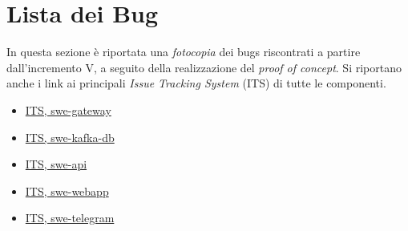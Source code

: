 

\newpage

\appendix
{}

\section{Lista dei Bug}

In questa sezione è riportata una \textit{fotocopia} dei bugs riscontrati a partire dall'incremento V, a seguito della realizzazione del \textit{proof of concept}. Si riportano anche i link ai principali \textit{Issue Tracking System} (ITS) di tutte le componenti.

	\begin{itemize}
		\item \href{https://github.com/RedRoundRobin/swe-gateway/issues}{ITS, swe-gateway}
		\item \href{https://github.com/RedRoundRobin/swe-kafka-db/issues}{ITS, swe-kafka-db}
		\item \href{https://github.com/RedRoundRobin/swe-api/issues}{ITS, swe-api}
		\item \href{https://github.com/RedRoundRobin/swe-webapp/issues}{ITS, swe-webapp}
		\item \href{https://github.com/RedRoundRobin/swe-telegram/issues}{ITS, swe-telegram}
	\end{itemize}

